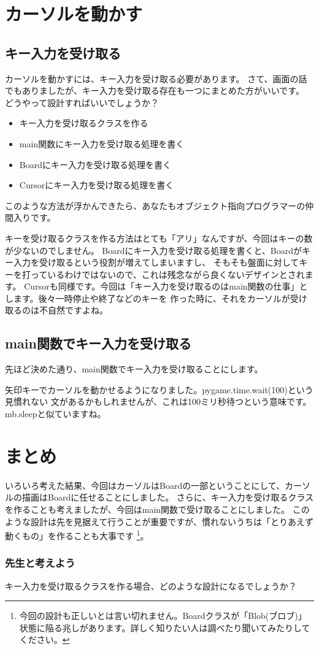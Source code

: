 \section{カーソルを動かす}
\subsection{キー入力を受け取る}
カーソルを動かすには、キー入力を受け取る必要があります。
さて、画面の話でもありましたが、キー入力を受け取る存在も一つにまとめた方がいいです。
どうやって設計すればいいでしょうか？
\begin{itemize}
  \item キー入力を受け取るクラスを作る
  \item main関数にキー入力を受け取る処理を書く
  \item Boardにキー入力を受け取る処理を書く
  \item Cursorにキー入力を受け取る処理を書く
\end{itemize}
このような方法が浮かんできたら、あなたもオブジェクト指向プログラマーの仲間入りです。

キーを受け取るクラスを作る方法はとても「アリ」なんですが、今回はキーの数が少ないのでしません。
Boardにキー入力を受け取る処理を書くと、Boardがキー入力を受け取るという役割が増えてしまいますし、
そもそも盤面に対してキーを打っているわけではないので、これは残念ながら良くないデザインとされます。
Cursorも同様です。今回は「キー入力を受け取るのはmain関数の仕事」とします。後々一時停止や終了などのキーを
作った時に、それをカーソルが受け取るのは不自然ですよね。

\subsection{main関数でキー入力を受け取る}
先ほど決めた通り、main関数でキー入力を受け取ることにします。

矢印キーでカーソルを動かせるようになりました。pygame.time.wait(100)という見慣れない
文があるかもしれませんが、これは100ミリ秒待つという意味です。mb.sleepと似ていますね。

\section{まとめ}
いろいろ考えた結果、今回はカーソルはBoardの一部ということにして、カーソルの描画はBoardに任せることにしました。
さらに、キー入力を受け取るクラスを作ることも考えましたが、今回はmain関数で受け取ることにしました。
このような設計は先を見据えて行うことが重要ですが、慣れないうちは「とりあえず動くもの」を作ることも大事です
\footnote{今回の設計も正しいとは言い切れません。Boardクラスが「Blob(ブロブ)」状態に陥る兆しがあります。詳しく知りたい人は調べたり聞いてみたりしてください。}。

\subsubsection{先生と考えよう}
キー入力を受け取るクラスを作る場合、どのような設計になるでしょうか？